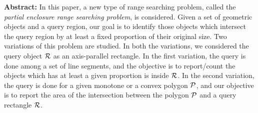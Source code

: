 {\bf Abstract:}
In this paper, a new type of range searching problem, called the 
\emph{partial enclosure range searching problem}, is considered. 
Given a set of geometric objects and a query region, our goal is 
to identify those objects which intersect the query region by at 
least a fixed proportion of their original size. Two variations 
of this problem are studied. In both the variations, we considered 
the query object $\cal R$ as an axis-parallel rectangle. In the 
first variation, the query is done among a set of line segments, 
and the objective is to report/count the objects which has at 
least a given proportion is inside $\cal R$.  In the second 
variation, the query is done for a given monotone or a convex 
polygon $\cal P$, and our objective is to report the area of 
the intersection between the polygon $\cal P$ and a query 
rectangle $\cal R$.  
